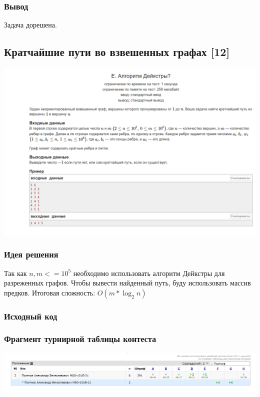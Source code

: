 \subsubsection*{Вывод}
Задача дорешена.

\vspace{20pt}

\pagebreak

\subsection*{Кратчайшие пути во взвешенных графах [12]}
\begin{center}
\includegraphics[width=\textwidth]{statements/14.png}
\end{center}
\subsubsection*{Идея решения}
Так как $n, m <= 10^5$ необходимо использовать алгоритм Дейкстры для разреженных графов. Чтобы вывести найденный путь, буду использовать массив предков.
Итоговая сложность: $O(m*\log_{2} n)$
\subsubsection*{Исходный код}


\subsubsection*{Фрагмент турнирной таблицы контеста}
\begin{center}
\includegraphics[width=\textwidth]{standings/14.png}\newline\noindent
\end{center}

